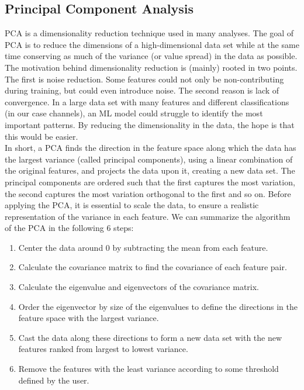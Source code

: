 \subsection{Principal Component Analysis}\label{subsec:PCA}
\acf{PCA} is a dimensionality reduction technique used in many analyses. The goal of
\ac{PCA} is to reduce the dimensions of a high-dimensional data set while at the same time conserving as 
much of the variance (or value spread) in the data as possible. The motivation behind dimensionality reduction 
is (mainly) rooted in two points. The first is noise reduction. Some features could not only be non-contributing 
during training, but could even introduce noise. The second reason is lack of convergence. In a large 
data set with many features and different classifications (in our case channels), an \ac{ML} model could struggle
to identify the most important patterns. By reducing the dimensionality in the data, the hope is that this 
would be easier. 
\\
In short, a \ac{PCA} finds the direction in the feature space along which the data has the largest 
variance (called principal components), using a linear combination of the original features, and projects the
data upon it, creating a new data set. The principal components are ordered such that the first captures the most variation,
the second captures the most variation orthogonal to the first and so on. Before applying the \ac{PCA}, it is essential to 
scale the data, to ensure a realistic representation of the variance in each feature.  We can summarize the algorithm of the 
\ac{PCA} in the following 6 steps:
\begin{enumerate}
    \item Center the data around 0 by subtracting the mean from each feature.
    \item Calculate the covariance matrix to find the covariance 
                             of each feature pair.
    \item Calculate the eigenvalue and eigenvectors of the covariance matrix.
    \item Order the eigenvector by size of the eigenvalues to define the directions 
                             in the feature space with the largest variance.
    \item Cast the data along these directions to form a new data set with 
                             the new features ranked from largest to lowest variance.
    \item Remove the features with the least variance according to some threshold
                            defined by the user.                      
\end{enumerate}
